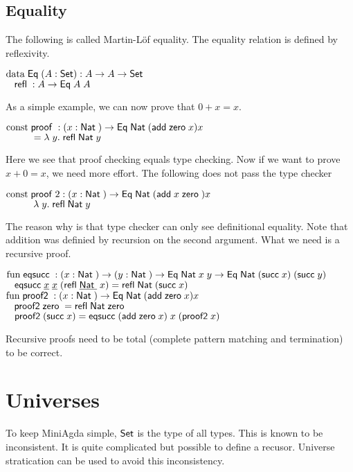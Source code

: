 \subsection{Equality}
The following is called Martin-L\"of equality.
The equality relation is defined by reflexivity.
\begin{bsp}
$\mathrm{data}\; \mathsf{Eq}\; ( A : \mathsf{Set} ) : A \rightarrow A \rightarrow \mathsf{Set} $ \\
$\hspace*{3mm} \mathsf{refl}\; : A \rightarrow \mathsf{Eq}\; A \; A  $
\end{bsp}
As a simple example, we can now prove that $ 0 + x = x $.
\begin{bsp}
$ \mathrm{const}\; \mathsf{proof}\; : ( x : \mathsf{Nat}\; ) \rightarrow{\mathsf{Eq}\;\mathsf{Nat}\;(\mathsf{add}\;\mathsf{zero}\;x) x} $ \\ 
$ \spcx = \lam{y}\refl \Nat y$ 
\end{bsp}
Here we see that proof checking equals type checking.
Now if we want to prove $ x + 0 = x $, we need more effort.
The following does not pass the type checker
\begin{bsp}
$ \mathrm{const}\; \mathsf{proof}\;2 : ( x : \mathsf{Nat}\; ) \rightarrow{\mathsf{Eq}\;\mathsf{Nat}\;(\mathsf{add}\;x \; \mathsf{zero}\;)  x} $ \\ 
$ \spcx \lam{y} \refl \Nat y$ 
\end{bsp}
The reason why is that type checker can only see definitional equality.
Note that addition was definied by recursion on the second argument. 
What we need is a recursive proof.

\begin{bsp}
$\mathrm{fun}\; \mathsf{eqsucc}\; : ( x : \mathsf{Nat}\; ) \rightarrow( y : \mathsf{Nat}\; ) \rightarrow \mathsf{Eq}\; \mathsf{Nat}\; x \; y \rightarrow \mathsf{Eq}\; \mathsf{Nat}\; (\mathsf{succ}\; x) \; (\mathsf{succ}\; y)$ \\
$\hspace*{3mm} \mathsf{eqsucc}\; \underline{x} \; \underline{x} \; (\mathsf{refl}\; \underline{\mathsf{Nat}\;} \; x) = \mathsf{refl}\; \mathsf{Nat}\; (\mathsf{succ}\; x)$\\
$\mathrm{fun}\; \mathsf{proof2}\; : ( x : \mathsf{Nat}\; ) \rightarrow \mathsf{Eq}\; \mathsf{Nat}\; (\mathsf{add}\; \mathsf{zero}\; x) x$\\
$\hspace*{3mm} \mathsf{proof2}\; \mathsf{zero}\; = \mathsf{refl}\; \mathsf{Nat}\; \mathsf{zero}\;$\\
$\hspace*{3mm} \mathsf{proof2}\; (\mathsf{succ}\; x) = \mathsf{eqsucc}\; (\mathsf{add}\; \mathsf{zero}\; x)\; x \; (\mathsf{proof2}\; x)$
\end{bsp}

Recursive proofs need to be total (complete pattern matching and termination) to be correct.

\section{Universes}
To keep MiniAgda simple, $\mathsf{Set}$ is the type of all types.
This is known to be inconsistent.
It is quite complicated but possible to define a recusor.
Universe stratication can be used to avoid this inconsistency.

